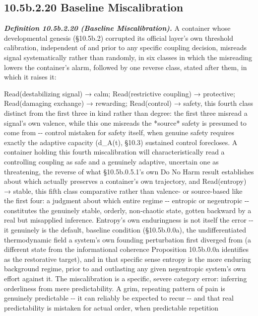\documentclass[
]{article}
\begin{document}
\hypertarget{b.2.20-baseline-miscalibration}{%
\subsection{10.5b.2.20 Baseline
Miscalibration}\label{b.2.20-baseline-miscalibration}}

\emph{\textbf{Definition 10.5b.2.20 (Baseline Miscalibration).}} A
container whose developmental genesis (§10.5b.2) corrupted its official
layer's own threshold calibration, independent of and prior to any
specific coupling decision, misreads signal systematically rather than
randomly, in six classes in which the misreading lowers the container's
alarm, followed by one reverse class, stated after them, in which it
raises it:

Read(destabilizing signal) → calm; Read(restrictive coupling) →
protective; Read(damaging exchange) → rewarding; Read(control) → safety,
this fourth class distinct from the first three in kind rather than
degree: the first three misread a signal's own valence, while this one
misreads the *source* safety is presumed to come from -\/- control
mistaken for safety itself, when genuine safety requires exactly the
adaptive capacity (d\_A(t), §10.3) sustained control forecloses. A
container holding this fourth miscalibration will characteristically
read a controlling coupling as safe and a genuinely adaptive, uncertain
one as threatening, the reverse of what §10.5b.0.5.1's own Do No Harm
result establishes about which actually preserves a container's own
trajectory, and Read(entropy) → stable, this fifth class comparative
rather than valence- or source-based like the first four: a judgment
about which entire regime -\/- entropic or negentropic -\/- constitutes
the genuinely stable, orderly, non-chaotic state, gotten backward by a
real but misapplied inference. Entropy's own enduringness is not itself
the error -\/- it genuinely is the default, baseline condition
(§10.5b.0.0a), the undifferentiated thermodynamic field a system's own
founding perturbation first diverged from (a different state from the
informational coherence Proposition 10.5b.0.0a identifies as the
restorative target), and in that specific sense entropy is the more
enduring background regime, prior to and outlasting any given
negentropic system's own effort against it. The miscalibration is a
specific, severe category error: inferring orderliness from mere
predictability. A grim, repeating pattern of pain is genuinely
predictable -\/- it can reliably be expected to recur -\/- and that real
predictability is mistaken for actual order, when predictable repetition
\end{document}
